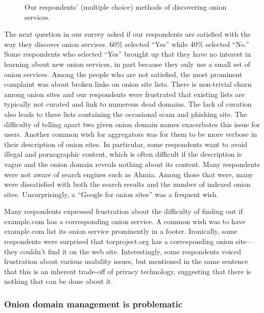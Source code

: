 \begin{figure}[t]
    \centering
    
    \caption{Our respondents' (multiple choice) methods of discovering onion
    services.}
    \label{fig:onion-discovery}
\end{figure}

The next question in our survey asked if our respondents are satisfied with the
way they discover onion services.  60\% selected ``Yes'' while 40\% selected
``No.'' Some respondents who selected ``Yes'' brought up that they have no
interest in learning about new onion services, in part because they only use a
small set of onion services.  Among the people who are not satisfied, the most
prominent complaint was about broken links on onion site lists.  There is
non-trivial churn among onion sites and our respondents were frustrated that
existing lists are typically not curated and link to numerous dead domains.  The
lack of curation also leads to these lists containing the occasional scam and
phishing site.  The difficulty of telling apart two given onion domain names
exacerbates this issue for users.  Another common wish for aggregators was for
them to be more verbose in their description of onion sites.  In particular,
some respondents want to avoid illegal and pornographic content, which is often
difficult if the description is vague and the onion domain reveals nothing about
its content.  Many respondents were not aware of search engines such as Ahmia.
Among those that were, many were dissatisfied with both the search results and
the number of indexed onion sites.  Unsurprisingly, a ``Google for onion sites''
was a frequent wish.

Many respondents expressed frustration about the difficulty of finding out if
example.com has a corresponding onion service.  A common wish was to have
example.com list its onion service prominently in a footer.  Ironically, some
respondents were surprised that torproject.org has a corresponding onion
site---they couldn't find it on the web site.  Interestingly, some respondents
voiced frustration about various usability issues, but mentioned in the same
sentence that this is an inherent trade-off of privacy technology, suggesting
that there is nothing that can be done about it.

\subsubsection{Onion domain management is problematic}

